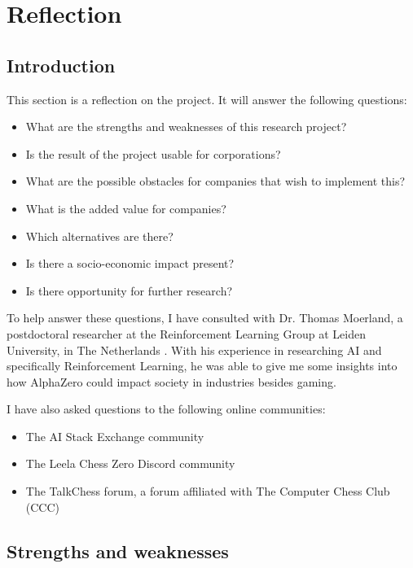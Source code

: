 \documentclass{article}
\begin{document}
\newpage
\section{Reflection}

\subsection{Introduction}

This section is a reflection on the project. It will answer the following questions:

\begin{itemize}
    \item What are the strengths and weaknesses of this research project?
    \item Is the result of the project usable for corporations?
    \item What are the possible obstacles for companies that wish to implement this?
    \item What is the added value for companies?
    \item Which alternatives are there?
    \item Is there a socio-economic impact present?
    \item Is there opportunity for further research?
\end{itemize}

To help answer these questions, I have consulted with Dr. Thomas Moerland, a postdoctoral 
researcher at the Reinforcement Learning Group at Leiden University, in The Netherlands \cite{ThomasMoerlandPostdoc}. 
With his experience in researching AI and specifically Reinforcement Learning, he was able 
to give me some insights into how AlphaZero could impact society in industries besides gaming.

I have also asked questions to the following online communities:

\begin{itemize}
    \item The AI Stack Exchange community %
    \item The Leela Chess Zero Discord community 
    \item The TalkChess forum, a forum affiliated with The Computer Chess Club (CCC)
\end{itemize}

\subsection{Strengths and weaknesses}
\end{document}

